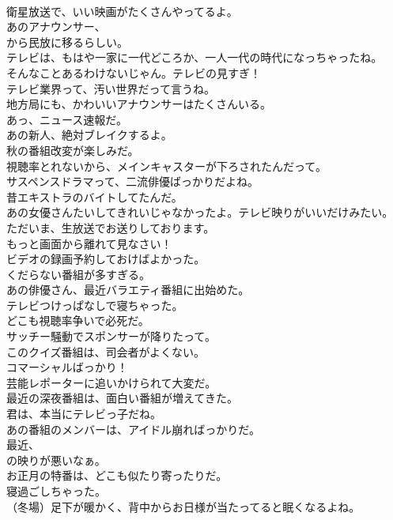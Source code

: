 \documentclass[8pt]{extreport}
\begin{document}
\begin{CJK}{UTF8}{min}
\\	衛星放送で、いい映画がたくさんやってるよ。	
\\	あのアナウンサー、
\\	から民放に移るらしい。	
\\	テレビは、もはや一家に一代どころか、一人一代の時代になっちゃったね。	
\\	そんなことあるわけないじゃん。テレビの見すぎ！	
\\	テレビ業界って、汚い世界だって言うね。	
\\	地方局にも、かわいいアナウンサーはたくさんいる。	
\\	あっ、ニュース速報だ。	
\\	あの新人、絶対ブレイクするよ。	
\\	秋の番組改変が楽しみだ。	
\\	視聴率とれないから、メインキャスターが下ろされたんだって。	
\\	サスペンスドラマって、二流俳優ばっかりだよね。	
\\	昔エキストラのバイトしてたんだ。	
\\	あの女優さんたいしてきれいじゃなかったよ。テレビ映りがいいだけみたい。	
\\	ただいま、生放送でお送りしております。	
\\	もっと画面から離れて見なさい！	
\\	ビデオの録画予約しておけばよかった。	
\\	くだらない番組が多すぎる。	
\\	あの俳優さん、最近バラエティ番組に出始めた。	
\\	テレビつけっぱなしで寝ちゃった。	
\\	どこも視聴率争いで必死だ。	
\\	サッチー騒動でスポンサーが降りたって。	
\\	このクイズ番組は、司会者がよくない。	
\\	コマーシャルばっかり！	
\\	芸能レポーターに追いかけられて大変だ。	
\\	最近の深夜番組は、面白い番組が増えてきた。	
\\	君は、本当にテレビっ子だね。	
\\	あの番組のメンバーは、アイドル崩ればっかりだ。	
\\	最近、
\\	の映りが悪いなぁ。	
\\	お正月の特番は、どこも似たり寄ったりだ。	
\\	寝過ごしちゃった。	
\\	（冬場）足下が暖かく、背中からお日様が当たってると眠くなるよね。	

\end{CJK}
\end{document}
